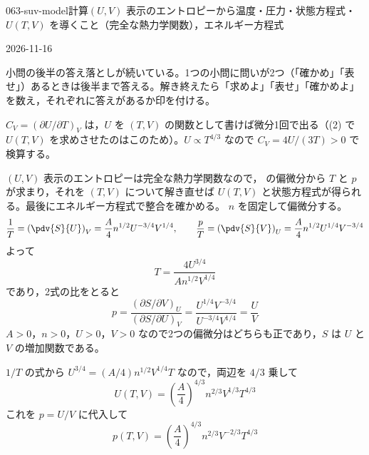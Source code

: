 \documentclass[uplatex,dvipdfmx,a4paper,11pt]{jsarticle}
\begin{document}
\begin{mondai}{063-suv-model}{計算}{$(U,V)$ 表示のエントロピーから温度・圧力・状態方程式・$U(T,V)$ を導くこと（完全な熱力学関数），エネルギー方程式}
\begin{kotaeutsushi}{2026-11-16}
\end{kotaeutsushi}
\begin{kizuki}
\item {} 小問の後半の答え落としが続いている。1つの小問に問いが2つ（「確かめ」「表せ」）あるときは後半まで答える。解き終えたら「求めよ」「表せ」「確かめよ」を数え，それぞれに答えがあるか印を付ける。
\item $C_{V}=(\partial U/\partial T)_{V}$ は，$U$ を $(T,V)$ の関数として書けば微分1回で出る（(2) で $U(T,V)$ を求めさせたのはこのため）。$U\propto T^{4/3}$ なので $C_{V}=4U/(3T)>0$ で検算する。
\end{kizuki}
\begin{tadashii}
\houshin $(U,V)$ 表示のエントロピーは完全な熱力学関数なので， の偏微分から $T$ と $p$ が求まり，それを $(T,V)$ について解き直せば $U(T,V)$ と状態方程式が得られる。最後にエネルギー方程式で整合を確かめる。
\keisan {} $n$ を固定して偏微分する。
\[ \frac{1}{T} = \left(\pdv{S}{U}\right)_{V} = \frac{A}{4}n^{1/2}U^{-3/4}V^{1/4}, \qquad \frac{p}{T} = \left(\pdv{S}{V}\right)_{U} = \frac{A}{4}n^{1/2}U^{1/4}V^{-3/4} \]
よって
\[ T = \frac{4U^{3/4}}{An^{1/2}V^{1/4}} \]
であり，2式の比をとると
\[ p = \frac{(\partial S/\partial V)_{U}}{(\partial S/\partial U)_{V}} = \frac{U^{1/4}V^{-3/4}}{U^{-3/4}V^{1/4}} = \frac{U}{V} \]
$A > 0$，$n > 0$，$U > 0$，$V > 0$ なので2つの偏微分はどちらも正であり，$S$ は $U$ と $V$ の増加関数である。

 $1/T$ の式から $U^{3/4} = (A/4)n^{1/2}V^{1/4}T$ なので，両辺を $4/3$ 乗して
\[ U(T,V) = \left(\frac{A}{4}\right)^{4/3}n^{2/3}V^{1/3}T^{4/3} \]
これを $p = U/V$ に代入して
\[ p(T,V) = \left(\frac{A}{4}\right)^{4/3}n^{2/3}V^{-2/3}T^{4/3} \]


\end{tadashii}
\end{mondai}
\end{document}
